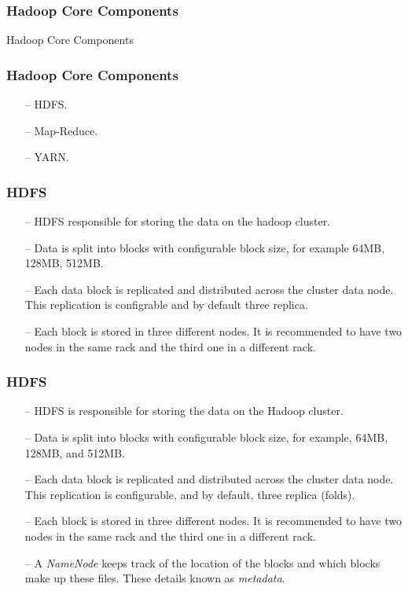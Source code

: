 \begin{frame}[c]{ }
	\frametitle{Hadoop Core Components }
	\centering     
	
	\textcolor{offgreen}{ \large Hadoop Core Components}
\end{frame}
\begin{frame}[c]{ }
	\frametitle{Hadoop Core Components }
	
	
	\begin{itemize}  [<+->]
		\item [--] HDFS.
		\item [--] Map-Reduce.
		\item [--] YARN.
		
	\end{itemize}
\end{frame}
\begin{frame}[c]{ }
	\frametitle{HDFS }
	
	
	\begin{itemize}  [<+->]
		\item [--] HDFS responsible for storing the data on the hadoop cluster.
		\item [--] Data is split into blocks with configurable block size, for example 64MB, 128MB, 512MB.
		\item [--] Each data block is replicated and distributed across the cluster data node. This replication is configrable and by default three replica.
		\item [--] Each block is stored in three different nodes. It is recommended to have two nodes in the same rack and the third one in a different rack.
		
	\end{itemize}
\end{frame}
\begin{frame}[c]{ }
	\frametitle{HDFS }
	
	
	\begin{itemize}  [<+->]
		\item [--] {\footnotesize HDFS is responsible for storing the data on the Hadoop cluster.}
		\item [--] {\footnotesize Data is split into blocks with configurable block size, for example, 64MB, 128MB, and 512MB.}
		\item [--] {\footnotesize Each data block is replicated and distributed across the cluster data node. This replication is configurable, and by default, three replica (folds).}
		\item [--] {\footnotesize Each block is stored in three different nodes. It is recommended to have two nodes in the same rack and the third one in a different rack.}
		\item [--] {\footnotesize A \textit{NameNode} keeps track of the location of the blocks and which blocks make up these files. These details known as \textit{metadata}.}
	\end{itemize}
\end{frame}
